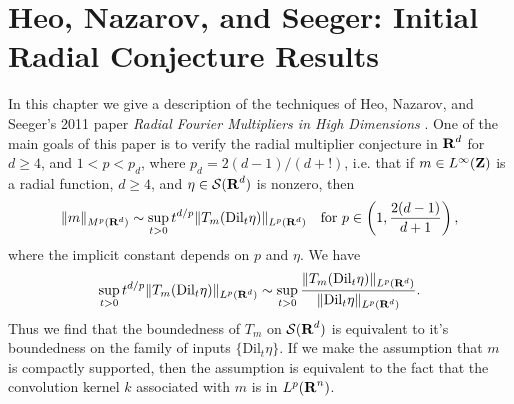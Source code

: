 





\chapter{Heo, Nazarov, and Seeger: Initial Radial Conjecture Results}

In this chapter we give a description of the techniques of Heo, Nazarov, and Seeger's 2011 paper \emph{Radial Fourier Multipliers in High Dimensions} \cite{HeoNazrovSeeger2011}. One of the main goals of this paper is to verify the radial multiplier conjecture in $\operatorname{\mathbf{R}}^d$ for $d \geq 4$, and $1 < p < p_d$, where $p_d = 2(d-1)/(d+!)$, i.e. that if $m \in L^\infty(\operatorname{\mathbf{Z}})$ is a radial function, $d \geq 4$, and $\eta \in \mathcal{S}(\operatorname{\mathbf{R}}^d)$ is nonzero, then
%
\[ \| m \|_{M^p(\operatorname{\mathbf{R}}^d)} \sim \sup_{t > 0} t^{d/p} \| T_m(\text{Dil}_t \eta) \|_{L^p(\operatorname{\mathbf{R}}^d)} \quad \text{for}\ p \in \left(1, \frac{2(d-1)}{d+1} \right), \]
%
where the implicit constant depends on $p$ and $\eta$. We have
%
\[ \sup_{t > 0} t^{d/p} \| T_m(\text{Dil}_t \eta) \|_{L^p(\operatorname{\mathbf{R}}^d)} \sim \sup_{t > 0} \frac{\| T_m(\text{Dil}_t \eta) \|_{L^p(\operatorname{\mathbf{R}}^d)}}{\| \text{Dil}_t \eta \|_{L^p(\operatorname{\mathbf{R}}^d)}}. \]
%
Thus we find that the boundedness of $T_m$ on $\mathcal{S}(\operatorname{\mathbf{R}}^d)$ is equivalent to it's boundedness on the family of inputs $\{ \text{Dil}_t \eta \}$. If we make the assumption that $m$ is compactly supported, then the assumption is equivalent to the fact that the convolution kernel $k$ associated with $m$ is in $L^p(\operatorname{\mathbf{R}}^n)$.

